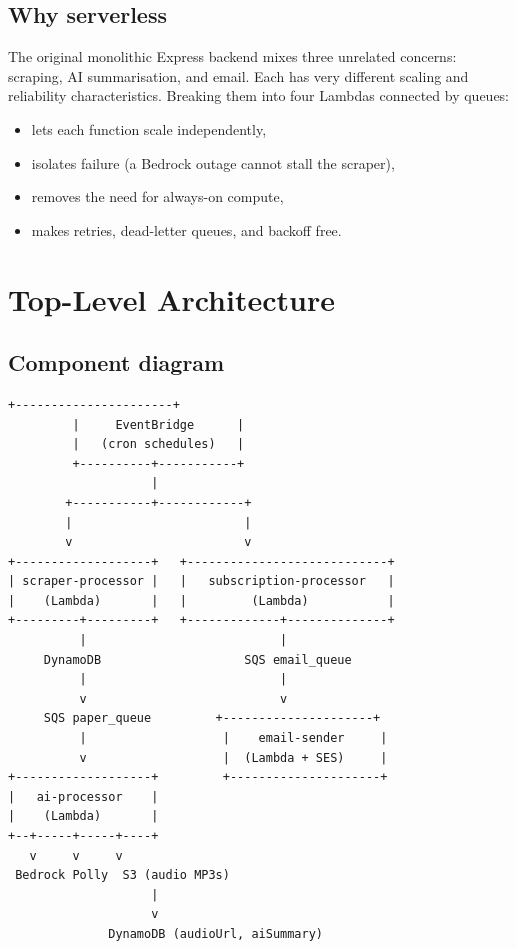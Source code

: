 \documentclass[11pt,a4paper]{article}
\begin{document}
\subsection{Why serverless}
The original monolithic Express backend mixes three unrelated concerns: scraping, AI summarisation, and email. Each has very different scaling and reliability characteristics. Breaking them into four Lambdas connected by queues:
\begin{itemize}[leftmargin=*]
  \item lets each function scale independently,
  \item isolates failure (a Bedrock outage cannot stall the scraper),
  \item removes the need for always-on compute,
  \item makes retries, dead-letter queues, and backoff free.
\end{itemize}

\section{Top-Level Architecture}

\subsection{Component diagram}
\begin{lstlisting}[basicstyle=\ttfamily\footnotesize]
         +----------------------+
         |     EventBridge      |
         |   (cron schedules)   |
         +----------+-----------+
                    |
        +-----------+------------+
        |                        |
        v                        v
+-------------------+   +----------------------------+
| scraper-processor |   |   subscription-processor   |
|    (Lambda)       |   |         (Lambda)           |
+---------+---------+   +-------------+--------------+
          |                           |
     DynamoDB                    SQS email_queue
          |                           |
          v                           v
     SQS paper_queue         +---------------------+
          |                   |    email-sender     |
          v                   |  (Lambda + SES)     |
+-------------------+         +---------------------+
|   ai-processor    |
|    (Lambda)       |
+--+-----+-----+----+
   v     v     v
 Bedrock Polly  S3 (audio MP3s)
                    |
                    v
              DynamoDB (audioUrl, aiSummary)
\end{lstlisting}
\end{document}
